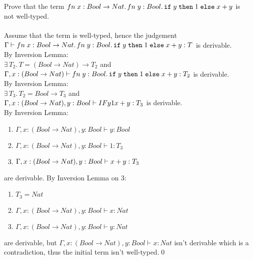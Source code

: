 \subsection{}

Prove that the term
$fn\;x: Bool \to Nat.\,fn\;y: Bool.\,\texttt{if}\;y\;\texttt{then}\;1\;\texttt{else}\;x+y$ is not well-typed.\\~\\
Assume that the term is well-typed, hence the judgement\\
$\Gamma \vdash fn\;x: Bool \to Nat.\,fn\;y: Bool.\,\texttt{if}\;y\;\texttt{then}\;1\;\texttt{else}\;x+y : T$
is derivable.\\
By Inversion Lemma:\\
$\exists\, T_2.\, T = (Bool \to Nat) \to T_2$ and\\
$\Gamma, x: (Bool \to Nat) \vdash fn\;y: Bool.\,\texttt{if}\;y\;\texttt{then}\;1\;\texttt{else}\;x+y: T_2$ is derivable.\\
By Inversion Lemma:\\
$\exists\, T_3.\, T_2 = Bool \to T_3$ and\\
$\Gamma, x: (Bool \to Nat), y: Bool \vdash IF{y}{1}{x+y}: T_3$ is derivable.\\
By Inversion Lemma:
\begin{enumerate}
	\item $\Gamma, x: (Bool \to Nat), y: Bool \vdash y: Bool$
	\item $\Gamma, x: (Bool \to Nat), y: Bool \vdash 1: T_3$
	\item $\Gamma, x: (Bool \to Nat), y: Bool \vdash x+y: T_3$
\end{enumerate}
are derivable.
By Inversion Lemma on 3:
\begin{enumerate}
	\item $T_3 = Nat$
	\item $\Gamma, x: (Bool \to Nat), y: Bool \vdash x: Nat$
	\item $\Gamma, x: (Bool \to Nat), y: Bool \vdash y: Nat$
\end{enumerate}
are derivable, but $\Gamma, x: (Bool \to Nat), y: Bool \vdash x: Nat$ isn't
derivable which is a\\
contradiction, thus the initial term isn't well-typed.\qed

